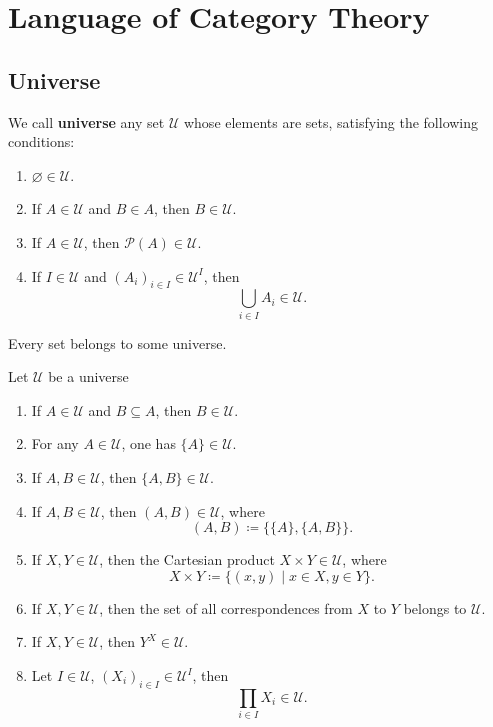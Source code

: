 \chapter{Language of Category Theory}
\section{Universe}
\begin{definitionenv}
    We call \textbf{universe} any set $\mathcal{U}$ whose elements are sets, satisfying the following conditions:
    \begin{enumerate}[label=(\alph*)]
        \item $\varnothing \in \mathcal{U}$.
        \item If $A\in \mathcal{U}$ and $B\in A$, then $B\in \mathcal{U}$.
        \item If $A\in \mathcal{U}$, then $\mathscr{P}(A)\in \mathcal{U}$.
        \item If $I\in \mathcal{U}$ and $(A_i)_{i\in I}\in \mathcal{U}^{I}$, then $$\bigcup_{i\in I} A_i\in \mathcal{U}.$$
    \end{enumerate}
\end{definitionenv}
\begin{axiomenv}
Every set belongs to some universe.
\end{axiomenv}
\begin{propositionenv}
    Let $\mathcal{U}$ be a universe
    \begin{enumerate}[label=(\arabic*)]
        \item If $A\in \mathcal{U}$ and $B\subseteq A$, then $B\in \mathcal{U}$.
        \item For any $A\in \mathcal{U}$, one has $\{A\}\in \mathcal{U}$.
        \item If $A,B\in \mathcal{U}$, then $\{A,B\}\in \mathcal{U}$.
        \item If $A,B\in \mathcal{U}$, then $(A,B)\in \mathcal{U}$, where $$ (A,B)\coloneq \{\{A\},\{A,B\}\}.$$
        \item If $X,Y\in \mathcal{U}$, then the Cartesian product $X\times Y\in \mathcal{U}$, where $$ X\times Y\coloneq \{(x,y)\mid x\in X, y\in Y\}.$$
        \item If $X,Y\in \mathcal{U}$, then the set of all correspondences from $X$ to $Y$ belongs to $\mathcal{U}$.
        \item If $X,Y\in \mathcal{U}$, then $Y^X\in \mathcal{U}$.
        \item Let $I\in \mathcal{U}$, $(X_i)_{i\in I}\in \mathcal{U}^I$, then $$\prod_{i\in I} X_i \in \mathcal{U}.$$
    \end{enumerate}
\end{propositionenv}
